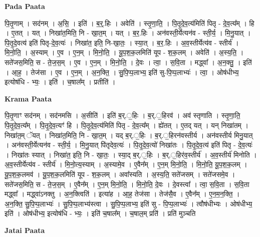 \documentclass[17pt]{extarticle}
\begin{document}
\textbf{Pada Paata} \newline

पि॒तृ॒णाम् । सद॑नम् । अ॒सि॒ । इति॑ । ब॒र्॒.हिः । अवेति॑ । स्तृ॒णा॒ति॒ । पि॒तृ॒दे॒व॒त्य॑मिति॑ पितृ - दे॒व॒त्य᳚म् । हि । ए॒तत् । यत् । निखा॑त॒मिति॒ नि - खा॒त॒म् । यत् । ब॒र॒.हिः । अन॑वस्ती॒र्येत्यन॑व - स्ती॒र्य॒ । मि॒नु॒यात् । पि॒तृ॒दे॒वत्य॑ इति॑ पितृ-दे॒व॒त्यः॑ । निखा॑त॒ इति॒ नि-खा॒तः॒ । स्या॒त् । ब॒र॒.हिः । अ॒व॒स्तीर्येत्य॑व - स्तीर्य॑ । मि॒नो॒ति॒ । अ॒स्याम् । ए॒व । ए॒न॒म् । मि॒नो॒ति॒ । यू॒प॒श॒क॒लमिति॑ यूप - श॒क॒लम् । अवेति॑ । अ॒स्य॒ति॒ । सते॑जस॒मिति॒ स - ते॒ज॒स॒म् । ए॒व । ए॒न॒म् । मि॒नो॒ति॒ । दे॒वः । त्वा॒ । स॒वि॒ता । मद्ध्वा᳚ । अ॒न॒क्तु॒ । इति॑ । आ॒ह॒ । तेज॑सा । ए॒व । ए॒न॒म् । अ॒न॒क्ति॒ । सु॒पि॒प्प॒लाभ्य॒ इति॑ सु-पि॒प्प॒लाभ्यः॑ । त्वा॒ । ओष॑धीभ्य॒ इत्योष॑धि - भ्यः॒ । इति॑ । च॒षाल᳚म् । प्रतीति॑ ।  \newline


\textbf{Krama Paata} \newline

पि॒तृ॒णाꣳ सद॑नम् । सद॑नमसि । अ॒सीति॑ । इति॑ ब॒र्.॒हिः । ब॒र्.॒हिरव॑ । अव॑ स्तृणाति । स्तृ॒णा॒ति॒ पि॒तृ॒दे॒व॒त्य᳚म् । पि॒तृ॒दे॒व॒त्यꣳ॑ हि । पि॒तृ॒दे॒व॒त्य॑मिति॑ पितृ - दे॒व॒त्य᳚म् । ह्ये॑तत् । ए॒तद् यत् । यन् निखा॑तम् । निखा॑त॒म् ॅयत् । निखा॑त॒मिति॒ नि - खा॒त॒म् । यद् ब॒र्.॒हिः । ब॒र्.॒हिरन॑वस्तीर्य । अन॑वस्तीर्य मिनु॒यात् । अन॑वस्ती॒र्येत्यन॑व - स्ती॒र्य॒ । मि॒नु॒यात् पि॑तृदेव॒त्यः॑ । पि॒तृ॒दे॒व॒त्यो॑ निखा॑तः । पि॒तृ॒दे॒व॒त्य॑ इति॑ पितृ - दे॒व॒त्यः॑ । निखा॑तः स्यात् । निखा॑त॒ इति॒ नि - खा॒तः॒ । स्या॒द् ब॒र्.॒हिः । ब॒र्.॒हिर॑व॒स्तीर्य॑ । अ॒व॒स्तीर्य॑ मिनोति । अ॒व॒स्तीर्येत्य॑व - स्तीर्य॑ । मि॒नो॒त्य॒स्याम् । अ॒स्यामे॒व । ए॒वैन᳚म् । ए॒न॒म् मि॒नो॒ति॒ । मि॒नो॒ति॒ यू॒प॒श॒क॒लम् । यू॒प॒श॒क॒लमव॑ । यू॒प॒श॒क॒लमिति॑ यूप - श॒क॒लम् । अवा᳚स्यति । अ॒स्य॒ति॒ सते॑जसम् । सते॑जसमे॒व । सते॑जस॒मिति॒ स - ते॒ज॒स॒म् । ए॒वैन᳚म् । ए॒न॒म् मि॒नो॒ति॒ । मि॒नो॒ति॒ दे॒वः । दे॒वस्त्वा᳚ । त्वा॒ स॒वि॒ता । स॒वि॒ता मद्ध्वा᳚ । मद्ध्वा॑ऽनक्तु । अ॒न॒क्त्विति॑ । इत्या॑ह । आ॒ह॒ तेज॑सा । तेज॑सै॒व । ए॒वैन᳚म् । ए॒न॒म॒न॒क्ति॒ । अ॒न॒क्ति॒ सु॒पि॒प्प॒लाभ्यः॑ । सु॒पि॒प्प॒लाभ्य॑स्त्वा । सु॒पि॒प्प॒लाभ्य॒ इति॑ सु - पि॒प्प॒लाभ्यः॑ । त्वौष॑धीभ्यः । ओष॑धीभ्य॒ इति॑ । ओष॑धीभ्य॒ इत्योष॑धि - भ्यः॒ । इति॑ च॒षाल᳚म् । च॒षाल॒म् प्रति॑ । प्रति॑ मुञ्चति \newline

\textbf{Jatai Paata} \newline
\end{document}
